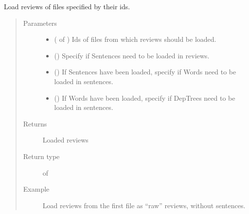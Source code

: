 \documentclass[letterpaper,10pt,english]{sphinxmanual}
\begin{document}
\begin{fulllineitems}
\label{\detokenize{load:loacore.load.review_load.load_reviews_by_id_files}}
Load reviews of files specified by their ids.
\begin{quote}\begin{description}
\item[{Parameters}] \leavevmode\begin{itemize}
\item {} 
 ( of ) \textendash{} Ids of files from which reviews should be loaded.

\item {} 
 () \textendash{} Specify if Sentences need to be loaded in reviews.

\item {} 
 () \textendash{} If Sentences have been loaded, specify if Words need to be loaded in sentences.

\item {} 
 () \textendash{} If Words have been loaded, specify if DepTrees need to be loaded in sentences.

\end{itemize}

\item[{Returns}] \leavevmode
Loaded reviews

\item[{Return type}] \leavevmode
{} of {\hyperref[\detokenize{classes:loacore.classes.classes.Review}]{}}

\item[{Example}] \leavevmode
Load reviews from the first file as “raw” reviews, without sentences.


\end{description}
\end{quote}
\end{fulllineitems}
\end{document}
